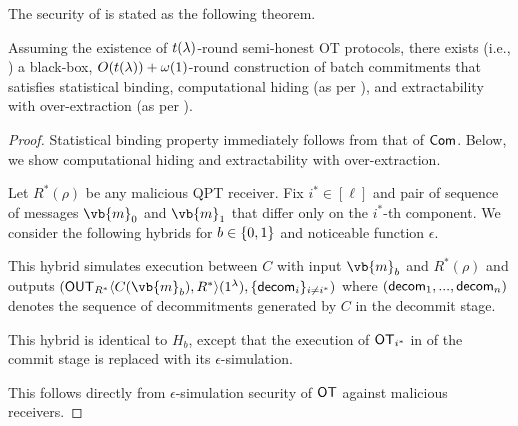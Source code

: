  The security of  is stated as the following theorem. 
\begin{theorem}\label{thm:OverExtBCom}
 Assuming the existence of $t(\lambda)$-round semi-honest OT protocols, there exists (i.e., ) a black-box, $O(t(\lambda))+\omega(1)$-round construction of  batch commitments 
 that satisfies statistical binding, computational hiding (as per ), and extractability with over-extraction (as per ). 
\end{theorem}   
\begin{proof}
Statistical binding property immediately follows from that of $\mathsf{Com}$. Below, we show computational hiding and extractability with over-extraction. 

Let $R^*(\rho)$ be any malicious QPT receiver.
Fix $i^*\in [\ell]$ and pair of sequence of messages $\vb{m}_0$ and $\vb{m}_1$ that differ only on the $i^*$-th component.
We consider the following hybrids for $b\in \{0,1\}$ and noticeable function $\epsilon$.

 This hybrid simulates execution between $C$ with input $\vb{m}_b$ and $R^*(\rho)$ and outputs $(\OUT_{R^*}\langle C(\vb{m}_b),R^* \rangle(1^\secpar),\{\decom_{i}\}_{i\ne i^*})$ 
where $(\mathsf{decom}_1,...,\mathsf{decom}_n)$ denotes the sequence of decommitments generated by $C$ in the decommit stage.

 This hybrid is identical to $H_b$, except that the execution of $\mathsf{OT}_{i^*}$ in  of the commit stage is replaced with its $\epsilon$-simulation. 

 This follows directly from $\epsilon$-simulation security of $\mathsf{OT}$ against malicious receivers. 


\end{proof}
